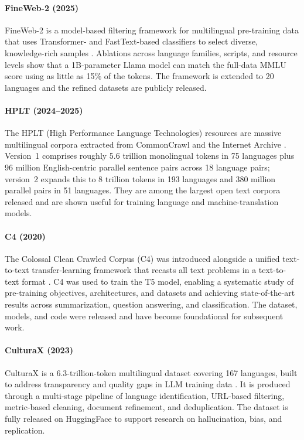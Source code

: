 \documentclass[letterpaper]{article}
\begin{document}
\paragraph{FineWeb-2 (2025)} FineWeb-2 is a model-based filtering framework for multilingual pre-training data that uses Transformer- and FastText-based classifiers to select diverse, knowledge-rich samples \citep{messmer2025enhancingmultilingualllmpretraining}. Ablations across language families, scripts, and resource levels show that a 1B-parameter Llama model can match the full-data MMLU score using as little as 15\% of the tokens. The framework is extended to 20 languages and the refined datasets are publicly released.

\paragraph{HPLT (2024--2025)} The HPLT (High Performance Language Technologies) resources are massive multilingual corpora extracted from CommonCrawl and the Internet Archive \citep{degibert2024newmassivemultilingualdataset,burchell2025expandedmassivemultilingualdataset}. Version~1 comprises roughly 5.6 trillion monolingual tokens in 75 languages plus 96 million English-centric parallel sentence pairs across 18 language pairs; version~2 expands this to 8 trillion tokens in 193 languages and 380 million parallel pairs in 51 languages. They are among the largest open text corpora released and are shown useful for training language and machine-translation models.

\paragraph{C4 (2020)} The Colossal Clean Crawled Corpus (C4) was introduced alongside a unified text-to-text transfer-learning framework that recasts all text problems in a text-to-text format \citep{raffel2023exploringlimitstransferlearning}. C4 was used to train the T5 model, enabling a systematic study of pre-training objectives, architectures, and datasets and achieving state-of-the-art results across summarization, question answering, and classification. The dataset, models, and code were released and have become foundational for subsequent work.

\paragraph{CulturaX (2023)} CulturaX is a 6.3-trillion-token multilingual dataset covering 167 languages, built to address transparency and quality gaps in LLM training data \citep{nguyen2023culturaxcleanedenormousmultilingual}. It is produced through a multi-stage pipeline of language identification, URL-based filtering, metric-based cleaning, document refinement, and deduplication. The dataset is fully released on HuggingFace to support research on hallucination, bias, and replication.
\end{document}
